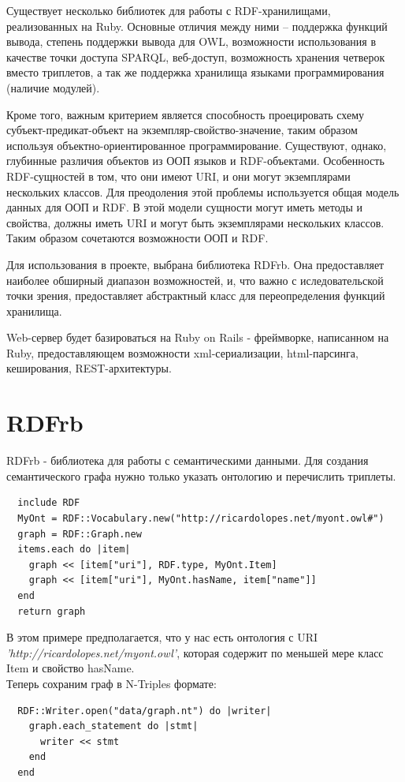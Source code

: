 \documentclass[specialist,subf,href,colorlinks=true
]{disser}
\begin{document}
Существует несколько библиотек для работы с RDF-хранилищами, реализованных на Ruby. Основные отличия между ними – поддержка функций вывода, степень поддержки вывода для OWL, возможности использования в качестве точки доступа SPARQL, веб-доступ, возможность хранения четверок вместо триплетов, а так же поддержка хранилища языками программирования (наличие модулей).

Кроме того, важным критерием является способность проецировать схему субъект-предикат-объект на экземпляр-свойство-значение, таким образом используя объектно-ориентированное программирование. Существуют, однако, глубинные различия объектов из ООП языков и RDF-объектами. Особенность RDF-сущностей в том, что они имеют URI, и они могут экземплярами нескольких классов. Для преодоления этой проблемы используется общая модель данных для ООП и RDF. В этой модели сущности могут иметь методы и свойства, должны иметь URI и могут быть экземплярами нескольких классов. Таким образом сочетаются возможности ООП и RDF.

Для использования в проекте, выбрана библиотека RDFrb. Она предоставляет наиболее обширный диапазон возможностей, и, что важно с иследовательской точки зрения, предоставляет абстрактный класс для переопределения функций хранилища.

Web-сервер будет базироваться на Ruby on Rails - фреймворке, написанном на Ruby, предоставляющем возможности xml-сериализации, html-парсинга, кеширования, REST-архитектуры.
\section{RDFrb}
RDFrb - библиотека для работы с семантическими данными. Для создания семантического графа нужно только указать онтологию и перечислить триплеты.
\begin{lstlisting}
  include RDF
  MyOnt = RDF::Vocabulary.new("http://ricardolopes.net/myont.owl#")
  graph = RDF::Graph.new
  items.each do |item|
    graph << [item["uri"], RDF.type, MyOnt.Item]
    graph << [item["uri"], MyOnt.hasName, item["name"]]
  end
  return graph
\end{lstlisting}
В этом примере предполагается, что у нас есть онтология с URI 
\\ \textit{'http://ricardolopes.net/myont.owl'}, которая содержит по меньшей мере класс Item и свойство hasName.
\\Теперь сохраним граф в N-Triples формате:
\begin{lstlisting}
  RDF::Writer.open("data/graph.nt") do |writer|
    graph.each_statement do |stmt|
      writer << stmt
    end
  end
\end{lstlisting}
\end{document}
